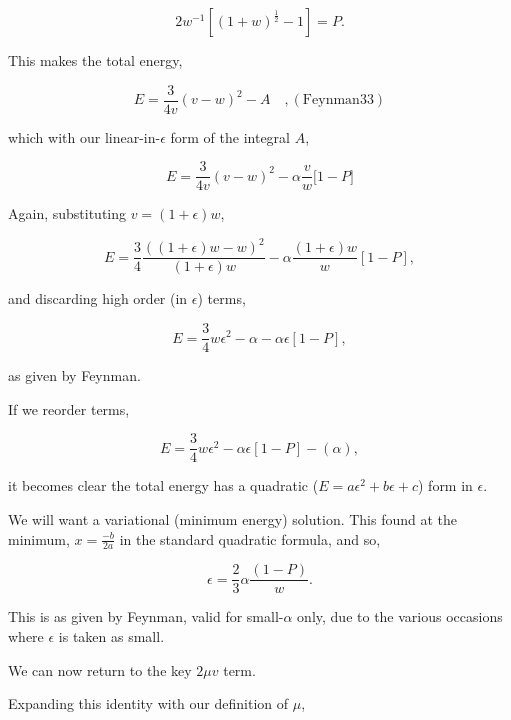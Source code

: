 \documentclass[twocolumn,11pt]{article}
\begin{document}
\begin{equation}
    2w^{-1} [ (1+w)^{\frac{1}{2}} - 1] = P .
\end{equation}

This makes the total energy,

\begin{equation}
    E=\frac{3}{4v}(v-w)^2-A 
    \quad \mathrm{, (Feynman33)}
\end{equation}

which with our linear-in-$\epsilon$ form of the integral $A$,

\begin{equation}
    E = \frac{3}{4v}(v-w)^2 - \alpha \frac{v}{w} {[}1-P{]}
\end{equation}

Again, substituting $v=(1+\epsilon)w$,

\begin{equation}
    E=\frac{3}{4}\frac{((1+\epsilon)w - w)^2}{(1+\epsilon)w}
       - \alpha\frac{(1+\epsilon)w}{w} [1-P], 
\end{equation}

and discarding high order (in $\epsilon$) terms,

\begin{equation}
    E = \frac{3}{4} w\epsilon^2 -\alpha -\alpha\epsilon[1-P],
\end{equation}

as given by Feynman.

If we reorder terms,

\begin{equation}
    E = \frac{3}{4} w\epsilon^2 -\alpha\epsilon[1-P]-(\alpha),
\end{equation}

it becomes clear the total energy has a quadratic ($E =a\epsilon^2 + b\epsilon +c $) form in $\epsilon$.

We will want a variational (minimum energy) solution. This found at the
minimum, $x=\frac{-b}{2a}$ in the standard quadratic formula, and so,

\begin{equation}
    \epsilon = \frac{2}{3} \alpha \frac{(1-P)}{w}.
\end{equation}

This is as given by Feynman, valid for small-$\alpha$ only, due to the various
occasions where $\epsilon$ is taken as small.

We can now return to the key $2\mu v$ term.

Expanding this identity with our definition of $\mu$,
\end{document}
